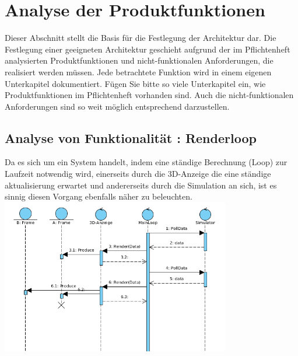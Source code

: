 \chapter{Analyse der Produktfunktionen}

Dieser Abschnitt stellt die Basis für die Festlegung der Architektur dar. Die
Festlegung einer geeigneten Architektur geschieht aufgrund der im Pflichtenheft
analysierten Produktfunktionen und nicht-funktionalen Anforderungen, die
realisiert werden müssen. Jede betrachtete Funktion wird in einem eigenen
Unterkapitel dokumentiert.  Fügen Sie bitte so viele Unterkapitel ein, wie
Produktfunktionen im Pflichtenheft vorhanden sind. Auch die nicht-funktionalen
Anforderungen sind so weit möglich entsprechend darzustellen.

%





\section{Analyse von Funktionalität :  Renderloop}
Da es sich um ein System handelt, indem eine ständige Berechnung (Loop) zur Laufzeit notwendig wird, einerseits durch die 3D-Anzeige die eine ständige aktualisierung erwartet und andererseits durch
die Simulation an sich, ist es sinnig diesen Vorgang ebenfalls näher zu beleuchten.
\includegraphics[width=10cm]{bilder/render_loop}

